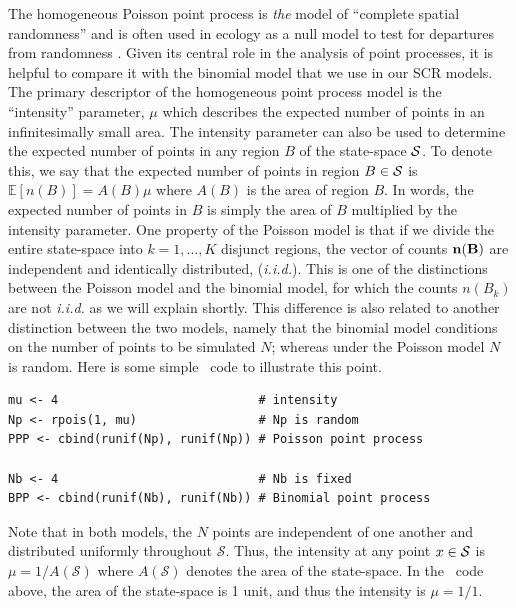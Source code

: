 The homogeneous Poisson point process is \emph{the} model of ``complete
spatial randomness'' and is often used in ecology as a null model
to test for departures from randomness
\citep{diggle:2003,illian_etal:2008}. Given its central role in the
analysis of point processes, it is helpful to compare it with
the binomial model that we use in our SCR models. The
primary descriptor of the homogeneous point process model is the
``intensity'' parameter, $\mu$ which describes the expected number
of points in an infinitesimally small area. The intensity
parameter can also be used to determine the expected number of points
in any region $B$ of the state-space $\cal{S}$. To denote this, we say
that the expected number of points in region $B \in \cal{S}$ is
$\mathbb{E}[n(B)] = A(B)\mu$ where $A(B)$ is the area of region $B$.  In words,
the expected number of points in $B$ is simply the area of $B$
multiplied by the intensity parameter. One property
of the Poisson model is that if we divide the entire state-space into
$k=1,\dots,K$ disjunct regions, the vector of counts $\bf n(B)$ are
independent and identically distributed, ({\it i.i.d.}). This is one
of the distinctions between the Poisson model and the binomial model,
for which the counts $n(B_k)$ are not {\it i.i.d.} as we will explain
shortly. This difference is also related to another distinction
between the two models, namely that the binomial model
conditions on the number of points to be simulated $N$; whereas under
the Poisson model $N$ is random. Here is some simple \R~code to
illustrate this point.

\begin{center} %
\begin{verbatim}
mu <- 4                            # intensity
Np <- rpois(1, mu)                 # Np is random
PPP <- cbind(runif(Np), runif(Np)) # Poisson point process

Nb <- 4                            # Nb is fixed
BPP <- cbind(runif(Nb), runif(Nb)) # Binomial point process
\end{verbatim}
\end{center}

Note that in both models, the $N$ points are independent
of one another and distributed uniformly
throughout $\mathcal{S}$. Thus, the intensity at any point $x \in
\cal{S}$ is $\mu = 1 / A(\mathcal{S})$ where $A(\mathcal{S})$ denotes
the area of the state-space. In the \R~code above, the area of the
state-space is 1 unit, and thus the intensity is $\mu = 1/1$.

